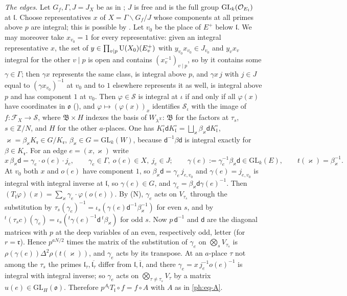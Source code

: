 \documentclass[10pt]{amsart}
\theoremstyle{definition}
\theoremstyle{remark}
\newcommand{\Z}{\mathbb Z}
\providecommand{\auGL}{\mathrm{GL}}
\providecommand{\auS}{\mathcal S}
\providecommand{\aubar}[1]{\overline{#1}}
\providecommand{\pao}{\mathfrak o}
\providecommand{\phB}{\mathfrak B}
\begin{document}
\emph{The edges.} Let $G_f,\Gamma,J=J_X$ be as in {\cite[\S14.3]{P46}}; $J$ is free and is the
full group $\auGL_k(\auO_{E_{\mathfrak l}})$ at $\mathfrak l$. Choose representatives $x$ of
$X=\Gamma\backslash G_f/J$ whose components at all primes above $p$ are integral; this is possible by {\cite[Corollary~6.4(a)]{P49}}. Let $v_0$ be the place of $E^+$ below
$\mathfrak l$. We may moreover take $x_{v_0}=1$ for every representative: given an integral
representative $x$, the set of $y\in\prod_{v\mid p}\mathrm U(X_0)(E^+_v)$ with $y_{v_0}x_{v_0}\in J_{v_0}$ and
$y_vx_v$ integral for the other $v\mid p$ is open and contains $(x_v^{-1})_{v\mid p}$, so by
{\cite[Proposition~6.3]{P49}} it contains some $\gamma\in\Gamma$; then $\gamma x$ represents the same
class, is integral above $p$, and $\gamma x\,j$ with $j\in J$ equal to $(\gamma x_{v_0})^{-1}$ at
$v_0$ and to $1$ elsewhere represents it as well, is integral above $p$ and has component $1$ at
$v_0$. Then $\varphi\in\auS$ is integral at $\iota$ if and only
if all $\varphi(x)$ have coordinates in $\pao$ ({\cite[Corollary~6.4(b)]{P49}}), and $\varphi\mapsto(\varphi(x))_x$ identifies
$\auS_\iota$ with the image of $f\colon\mathcal F_X\to\auS$, where
$\phB\times H$ indexes the basis of $W_{\lambda^X}$: $\phB$ for the factors at
$\tau_s$, $s\in\Z/N$, and $H$ for the other $a$-places. One has
$K^\circ_{\mathfrak l}\mathsf dK^\circ_{\mathfrak l}=\bigsqcup_{\varkappa}\beta_\varkappa\mathsf
dK^\circ_{\mathfrak l}$, $\varkappa=\beta_\varkappa K_{\mathfrak r}\in G/K_{\mathfrak r}$,
$\beta_\varkappa\in G=\auGL_k(W)$, because $\mathsf d^{-1}\beta\mathsf d$ is integral exactly for
$\beta\in K_{\mathfrak r}$. For an edge $e=(x,\varkappa)$ write
\[
x\,\beta_\varkappa\mathsf d=\gamma_e\cdot o(e)\cdot j_e,\qquad\gamma_e\in\Gamma,\ o(e)\in X,\
j_e\in J;\qquad\gamma(e):=\gamma_e^{-1}\beta_\varkappa\mathsf d\in\auGL_k(E),\qquad
t(\varkappa)=\beta_\varkappa^{-1}.
\]
At $v_0$ both $x$ and $o(e)$ have component $1$, so $\beta_\varkappa\mathsf d=\gamma_e\,j_{e,v_0}$
and $\gamma(e)=j_{e,v_0}$ is integral with integral inverse at $\mathfrak l$, so $\gamma(e)\in G$, and $\gamma_e=\beta_\varkappa\mathsf d\gamma(e)^{-1}$. Then
$(T_{\mathfrak l}\varphi)(x)=\sum_\varkappa\gamma_e\cdot\varphi(o(e))$. By (N), $\gamma_e$ acts on
$V_{\tau_s}$ through the substitution by $\tau_s(\gamma_e)^{-1}=\iota_s(\gamma(e)\mathsf d^{-1}
\beta_\varkappa^{-1})$ for even $s$, and by ${}^t(\tau_sc)(\gamma_e)=\iota_s({}^t\gamma(e)^{-1}
\mathsf d\,{}^t\beta_\varkappa)$ for odd $s$. Now $p\,\mathsf d^{-1}$ and $\mathsf d$ are the
diagonal matrices with $p$ at the deep variables of an even, respectively odd, letter (for
$r=\mathfrak r$). Hence $p^{aN/2}$ times the matrix of the substitution of $\gamma_e$ on
$\bigotimes_sV_{\tau_s}$ is $\rho(\gamma(e))\Delta^2\rho(t(\varkappa))$, and $\gamma_e$ acts by
its transpose. At an $a$-place $\tau$ not among the $\tau_s$ the primes $\mathfrak
l_\tau,\aubar{\mathfrak l_\tau}$ differ from $\mathfrak l,\aubar{\mathfrak l}$, and there
$\gamma_e=x\,j_e^{-1}o(e)^{-1}$ is integral with integral inverse; so $\gamma_e$ acts on
$\bigotimes_{\tau\ne\tau_s}V_\tau$ by a matrix $u(e)\in\auGL_H(\pao)$. Therefore
$p^{A_{\mathfrak l}}T_{\mathfrak l}\circ f=f\circ A$ with $A$ as in \eqref{ph:eq-A}.
\end{document}
